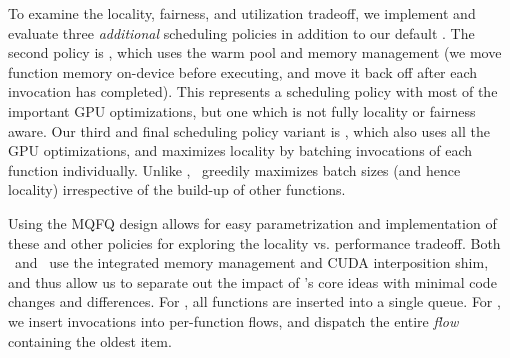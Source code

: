 
To examine the locality, fairness, and utilization tradeoff, we implement and evaluate three \emph{additional} scheduling policies in addition to our default \QName. 
The second policy is \fcfs, which uses the warm pool and memory management (we move function memory on-device before executing, and move it back off after each invocation has completed).
This represents a scheduling policy with most of the important GPU optimizations, but one which is not fully locality or fairness aware.
Our third and final scheduling policy variant is \batch, which also uses all the GPU optimizations, and maximizes locality by batching invocations of each function individually.
Unlike \QName, \batch~greedily maximizes batch sizes (and hence locality) irrespective of the build-up of other functions.  

Using the MQFQ design allows for easy parametrization and implementation of these and other policies for exploring the locality vs. performance tradeoff.
Both \fcfs~and \batch~use the integrated memory management and CUDA interposition shim, and thus allow us to separate out the impact of \QName's core ideas with minimal code changes and differences. 
For \fcfs, all functions are inserted into a single queue.
For \batch, we insert invocations into per-function flows, and dispatch the entire \emph{flow} containing the oldest item. %


